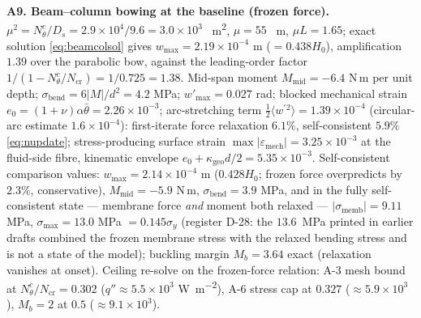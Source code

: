 \textbf{A9. Beam--column bowing at the baseline (frozen force).} $\mu^2=N_\theta^c/D_s
=2.9\times10^4/9.6=3.0\times10^3$ \si{\per\metre\squared}, $\mu=55$ \si{\per\metre}, $\mu L=1.65$;
exact solution \eqref{eq:beamcolsol} gives $w_{\max}=2.19\times10^{-4}$ m ($=0.438H_0$),
amplification $1.39$ over the parabolic bow, against the leading-order factor
$1/(1-N_\theta^c/N_{\mathrm{cr}})=1/0.725=1.38$. Mid-span moment
$M_{\mathrm{mid}}=-6.4$ N\,m per unit depth; $\sigma_{\mathrm{bend}}=6|M|/d^2=4.2$ MPa;
$w'_{\max}=0.027$ rad; blocked mechanical strain
$e_0=(1+\nu)\alpha\bar\theta=2.26\times10^{-3}$; arc-stretching term
$\tfrac12\langle w^{'}{}^2\rangle=1.39\times10^{-4}$ (circular-arc estimate $1.6\times10^{-4}$):
first-iterate force relaxation $6.1\%$, self-consistent $5.9\%$
\eqref{eq:nupdate}; stress-producing surface strain $\max|\varepsilon_{\mathrm{mech}}|=3.25\times10^{-3}$
at the fluid-side fibre, kinematic envelope $e_0+\kappa_{\mathrm{geo}}d/2=5.35\times10^{-3}$.
Self-consistent comparison values: $w_{\max}=2.14\times10^{-4}$ m ($0.428H_0$; frozen force
overpredicts by $2.3\%$, conservative), $M_{\mathrm{mid}}=-5.9$ N\,m,
$\sigma_{\mathrm{bend}}=3.9$ MPa, and in the fully self-consistent state --- membrane force
\emph{and} moment both relaxed --- $|\sigma_{\mathrm{memb}}|=9.11$ MPa, $\sigma_{\max}=13.0$ MPa
$=0.145\sigma_y$ (register D-28: the $13.6$~MPa printed in earlier drafts combined the frozen
membrane stress with the relaxed bending stress and is not a state of the model); buckling margin
$M_b=3.64$ exact (relaxation vanishes at onset). Ceiling re-solve on the frozen-force relation:
A-3 mesh bound at $N_\theta^c/N_{\mathrm{cr}}=0.302$ ($q''\approx5.5\times10^3$
\si{\watt\per\square\metre}), A-6 stress cap at $0.327$ ($\approx5.9\times10^3$),
$M_b=2$ at $0.5$ ($\approx9.1\times10^3$).

